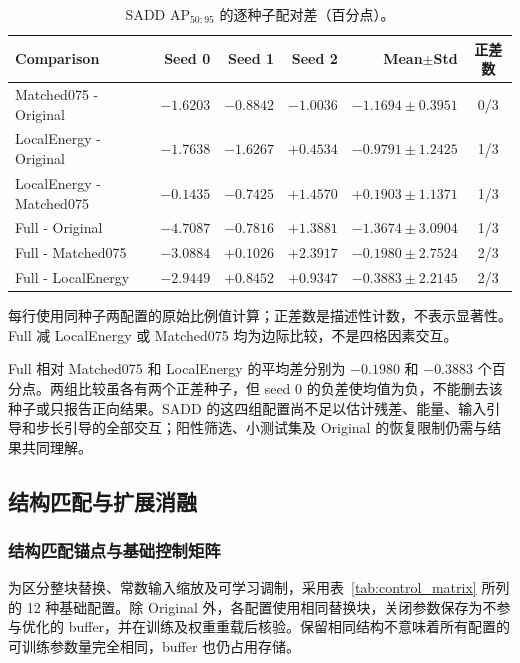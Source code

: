 \documentclass[journal]{IEEEtran}
\begin{document}
\begin{table}[!t]
\centering
\small
\setlength{\tabcolsep}{3pt}
\caption{SADD AP$_{50:95}$ 的逐种子配对差（百分点）。}
\label{tab:sadd_paired}
\begin{tabular*}{\textwidth}{@{\extracolsep{\fill}}lrrrrc}
\toprule
Comparison & Seed 0 & Seed 1 & Seed 2 & Mean$\pm$Std & 正差数 \\
\midrule
Matched075 - Original
& $-1.6203$ & $-0.8842$ & $-1.0036$
& $-1.1694\pm0.3951$ & 0/3 \\
LocalEnergy - Original
& $-1.7638$ & $-1.6267$ & $+0.4534$
& $-0.9791\pm1.2425$ & 1/3 \\
LocalEnergy - Matched075
& $-0.1435$ & $-0.7425$ & $+1.4570$
& $+0.1903\pm1.1371$ & 1/3 \\
Full - Original
& $-4.7087$ & $-0.7816$ & $+1.3881$
& $-1.3674\pm3.0904$ & 1/3 \\
Full - Matched075
& $-3.0884$ & $+0.1026$ & $+2.3917$
& $-0.1980\pm2.7524$ & 2/3 \\
Full - LocalEnergy
& $-2.9449$ & $+0.8452$ & $+0.9347$
& $-0.3883\pm2.2145$ & 2/3 \\
\bottomrule
\end{tabular*}
\smallskip
\begin{minipage}{\linewidth}
\footnotesize
每行使用同种子两配置的原始比例值计算；正差数是描述性计数，不表示显著性。Full 减 LocalEnergy 或 Matched075 均为边际比较，不是四格因素交互。
\end{minipage}
\end{table}

Full 相对 Matched075 和 LocalEnergy 的平均差分别为 $-0.1980$ 和 $-0.3883$ 个百分点。两组比较虽各有两个正差种子，但 seed 0 的负差使均值为负，不能删去该种子或只报告正向结果。SADD 的这四组配置尚不足以估计残差、能量、输入引导和步长引导的全部交互；阳性筛选、小测试集及 Original 的恢复限制仍需与结果共同理解。

\FloatBarrier


\subsection{结构匹配与扩展消融}
\label{sec:matched_controls}

\subsubsection{结构匹配锚点与基础控制矩阵}

为区分整块替换、常数输入缩放及可学习调制，采用表~\ref{tab:control_matrix} 所列的 12 种基础配置。除 Original 外，各配置使用相同替换块，关闭参数保存为不参与优化的 buffer，并在训练及权重重载后核验。保留相同结构不意味着所有配置的可训练参数量完全相同，buffer 也仍占用存储。
\end{document}
